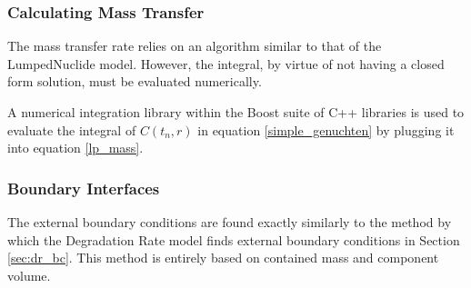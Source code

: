 \subsubsection{Calculating Mass Transfer}
The mass transfer rate relies on an algorithm similar to that of the 
LumpedNuclide model. However, the integral, by virtue of not having a closed 
form solution, must be evaluated numerically. 

A numerical integration library within the Boost suite of C++ libraries is used 
to evaluate the integral of $C(t_n, r)$ in equation \eqref{simple_genuchten} 
by plugging it into equation \eqref{lp_mass}.


\subsubsection{Boundary Interfaces}
The external boundary conditions are found exactly similarly to the method by 
which the Degradation Rate model finds external boundary conditions in Section 
\ref{sec:dr_bc}. This method is entirely based on contained mass and component 
volume.  
